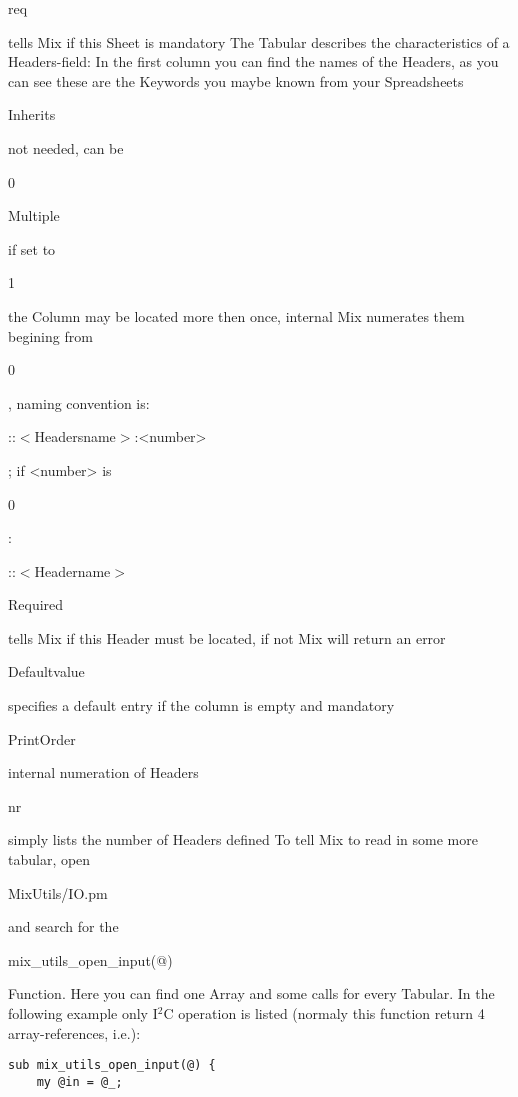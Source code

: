 \documentclass[a4paper,12pt]{article}
\begin{document}
{  \begin{tt}req\end{tt} tells Mix if this Sheet is mandatory\newline
\newline
The Tabular describes the characteristics of a Headers-field:\newline
In the first column you can find the names of the Headers, as you can see these are the Keywords you maybe known from your Spreadsheets\newline
\begin{tt}Inherits\end{tt} not needed, can be \begin{tt}0\end{tt}\newline
\begin{tt}Multiple\end{tt} if set to \begin{tt}1\end{tt} the Column may be located more then once, internal Mix numerates them begining from \begin{tt}0\end{tt}, naming convention is: \begin{tt}::$<$Headersname$>$:<number>\end{tt}; if <number> is \begin{tt}0\end{tt}: \begin{tt}::$<$Headername$>$\end{tt}\newline
\begin{tt}Required\end{tt} tells Mix if this Header must be located, if not Mix will return an error\newline
\begin{tt}Defaultvalue\end{tt} specifies a default entry if the column is empty and mandatory\newline
\begin{tt}PrintOrder\end{tt} internal numeration of Headers\newline
\begin{tt}nr\end{tt} simply lists the number of Headers defined\newline
\newline
To tell Mix to read in some more tabular, open \begin{tt}MixUtils/IO.pm\end{tt} and search for the \begin{tt}mix\_utils\_open\_input(@)\end{tt} Function. Here you can find one Array and some calls for every Tabular. In the following example only I$^2$C operation is listed (normaly this function return 4 array-references, i.e.):
\begin{verbatim}
sub mix_utils_open_input(@) {
    my @in = @_;


\end{verbatim}}
\end{document}
